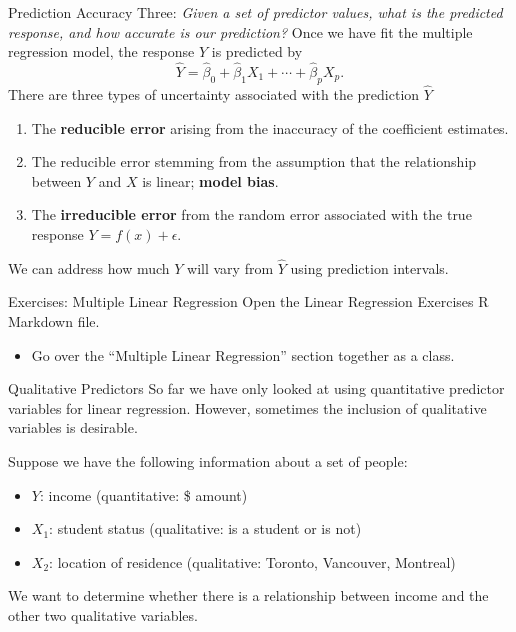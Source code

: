 \documentclass[
  ignorenonframetext,
  aspectratio=169,
]{beamer}
\providecommand{\tightlist}{%
  \setlength{\itemsep}{0pt}\setlength{\parskip}{0pt}}\usepackage{longtable,booktabs,array}
\begin{document}
\begin{frame}{Prediction Accuracy}
\protect\hypertarget{prediction-accuracy}{}
Three: \emph{Given a set of predictor values, what is the predicted
response, and how accurate is our prediction?} Once we have fit the
multiple regression model, the response \(Y\) is predicted by \[
        \hat Y = \hat{\beta}_{0}+\hat{\beta}_{1} X_{1}+\cdots+\hat{\beta}_{p} X_{p}.
        \] There are three types of uncertainty associated with the
prediction \(\hat Y\)

\begin{enumerate}
\item
  The \textbf{reducible error} arising from the inaccuracy of the
  coefficient estimates.
\item
  The reducible error stemming from the assumption that the relationship
  between \(Y\) and \(X\) is linear; \textbf{model bias}.
\item
  The \textbf{irreducible error} from the random error associated with
  the true response \(Y = f(x) + \epsilon\).
\end{enumerate}

We can address how much \(Y\) will vary from \(\hat Y\) using prediction
intervals.
\end{frame}

\begin{frame}{Exercises: Multiple Linear Regression}
\protect\hypertarget{exercises-multiple-linear-regression}{}
Open the Linear Regression Exercises R Markdown file.

\begin{itemize}
\tightlist
\item
  Go over the ``Multiple Linear Regression'' section together as a
  class.
\end{itemize}
\end{frame}

\begin{frame}{Qualitative Predictors}
\protect\hypertarget{qualitative-predictors}{}
So far we have only looked at using quantitative predictor variables for
linear regression. However, sometimes the inclusion of qualitative
variables is desirable.

Suppose we have the following information about a set of people:

\begin{itemize}
\item
  \(Y\): income (quantitative: \$ amount)
\item
  \(X_1\): student status (qualitative: is a student or is not)
\item
  \(X_2\): location of residence (qualitative: Toronto, Vancouver,
  Montreal)
\end{itemize}

We want to determine whether there is a relationship between income and
the other two qualitative variables.
\end{frame}
\end{document}

